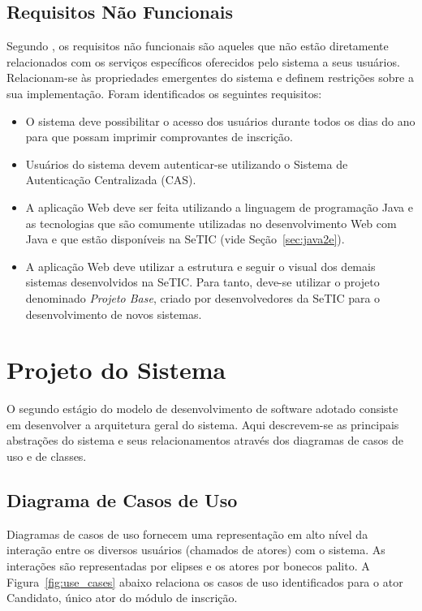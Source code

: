 \documentclass[
  10.5pt,				  %
	openright,			%
	twoside,			  %
  a5paper,
  chapter=TITLE,	%
	section=TITLE,	%
  hyphens,        %
	english,        %
	brazil          %
]{abntex2}
\begin{document}
\subsection{Requisitos Não Funcionais}

Segundo \cite{sommerville2011}, os requisitos não funcionais são aqueles que não estão diretamente relacionados com os serviços específicos oferecidos pelo sistema a seus usuários. Relacionam-se às propriedades emergentes do sistema e definem restrições sobre a sua implementação. Foram identificados os seguintes requisitos:

\begin{itemize}
\item O sistema deve possibilitar o acesso dos usuários durante todos os dias do ano para que possam imprimir comprovantes de inscrição.
\item Usuários do sistema devem autenticar-se utilizando o Sistema de Autenticação Centralizada (CAS).
\item A aplicação Web deve ser feita utilizando a linguagem de programação Java e as tecnologias que são comumente utilizadas no desenvolvimento Web com Java e que estão disponíveis na SeTIC (vide Seção~\ref{sec:java2e}).
\item A aplicação Web deve utilizar a estrutura e seguir o visual dos demais sistemas desenvolvidos na SeTIC. Para tanto, deve-se utilizar o projeto denominado \emph{Projeto Base}, criado por desenvolvedores da SeTIC para o desenvolvimento de novos sistemas.
\end{itemize}

\section{Projeto do Sistema}

O segundo estágio do modelo de desenvolvimento de software adotado consiste em desenvolver a arquitetura geral do sistema. Aqui descrevem-se as principais abstrações do sistema e seus relacionamentos através dos diagramas de casos de uso e de classes.

\subsection{Diagrama de Casos de Uso}

Diagramas de casos de uso fornecem uma representação em alto nível da interação entre os diversos usuários (chamados de atores) com o sistema. As interações são representadas por elipses e os atores por bonecos palito. A Figura~\ref{fig:use_cases} abaixo relaciona os casos de uso identificados para o ator Candidato, único ator do módulo de inscrição.
\end{document}
